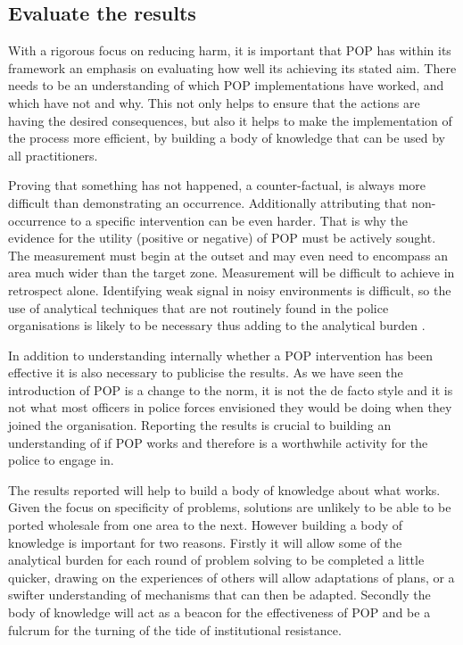  
 
\subsection{Evaluate the results}

With a rigorous focus on reducing harm, it is important that POP has within its framework an emphasis on evaluating how well its achieving its stated aim. There needs to be an understanding of which POP implementations have worked, and which have not and why. This not only helps to ensure that the actions are having the desired consequences, but also it helps to make the implementation of the process more efficient, by building a body of knowledge that can be used by all practitioners. 
 
Proving that something has not happened, a counter-factual, is always more difficult than demonstrating an occurrence. Additionally attributing that non-occurrence to a specific intervention can be even harder. That is why the evidence for the utility (positive or negative) of POP must be actively sought. The measurement must begin at the outset and may even need to encompass an area much wider than the target zone. Measurement will be difficult to achieve in retrospect alone. Identifying weak signal in noisy environments is difficult, so the use of analytical techniques that are not routinely found in the police organisations is likely to be necessary thus adding to the analytical burden \parencite{popchap11}.  

In addition to understanding internally whether a POP intervention has been effective it is also necessary to publicise the results. As we have seen the introduction of POP is a change to the norm, it is not the de facto style and it is not what most officers in police forces envisioned they would be doing when they joined the organisation. Reporting the results is crucial to building an understanding of if POP works and therefore is a worthwhile activity for the police to engage in.

The results reported will help to build a body of knowledge about what works. Given the focus on specificity of problems, solutions are unlikely to be able to be ported wholesale from one area to the next. However building a body of knowledge is important for two reasons. Firstly it will allow some of the analytical burden for each round of problem solving to be completed a little quicker, drawing on the experiences of others will allow adaptations of plans, or a swifter understanding of mechanisms that can then be adapted. Secondly the body of knowledge will act as a beacon for the effectiveness of POP and be a fulcrum for the turning of the tide of institutional resistance.
 
